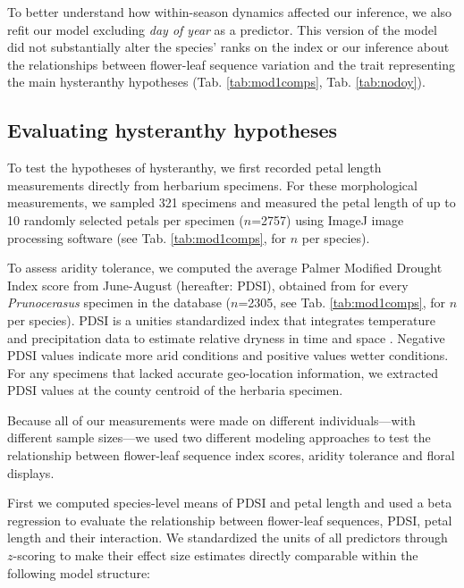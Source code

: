\documentclass{article}[12pt]
\begin{document}
To better understand how within-season dynamics affected our inference, we also refit our model excluding \emph{day of year} as a predictor. This version of the model did not substantially alter the species' ranks on the index or our inference about the relationships between flower-leaf sequence variation and the trait representing the main hysteranthy hypotheses (Tab. \ref{tab:mod1comps}, Tab. \ref{tab:nodoy}). 

\subsection*{Evaluating hysteranthy hypotheses}
To test the hypotheses of hysteranthy, we first recorded petal length measurements directly from herbarium specimens. For these morphological measurements, we sampled 321 specimens and measured the petal length of up to 10 randomly selected petals per specimen ($n$=2757) using ImageJ image processing software (see Tab. \ref{tab:mod1comps}, for $n$ per species).%

To assess aridity tolerance, we computed the average Palmer Modified Drought Index score from June-August (hereafter: PDSI), obtained from \citet{Gile_2017} for every \textit{Prunocerasus} specimen in the database ($n$=2305, see Tab. \ref{tab:mod1comps}, for $n$ per species). PDSI is a unities standardized index that integrates temperature and precipitation data to estimate relative dryness in time and space \citep{Heim:2002uw}. Negative PDSI values indicate more arid conditions and positive values wetter conditions. %
For any specimens that lacked accurate geo-location information, we extracted PDSI values at the county centroid of the herbaria specimen. 

Because all of our measurements were made on different individuals---with different sample sizes---we used two different modeling approaches to test the relationship between flower-leaf sequence index scores, aridity tolerance and floral displays.

First we computed species-level means of PDSI and petal length and used a beta regression to evaluate the relationship between flower-leaf sequences, PDSI, petal length and their interaction. We standardized the units of all predictors through $z$-scoring \citep{Gelman2007} to make their effect size estimates directly comparable within the following model structure:\\
\end{document}
